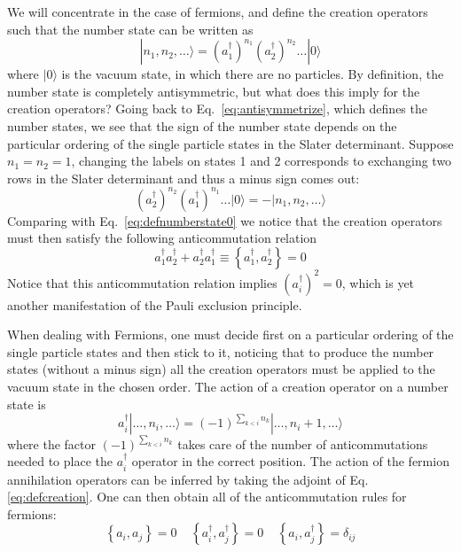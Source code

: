 \documentclass[oneside,11pt]{memoir}
\begin{document}
We will concentrate in the case of fermions, and define the creation operators
such that the number state can be written as 
\begin{equation}
 | n_{1}, n_{2}, \ldots \rangle = 
    \left( a_{1}^{\dagger}\right)^{n_{1}} 
    \left( a_{2}^{\dagger}\right)^{n_{2}} \ldots |0\rangle 
\label{eq:defnumberstate0}
\end{equation}
where $|0\rangle$ is the vacuum state, in which there are no particles.  By
definition, the number state is completely antisymmetric, but what does this
imply for the creation operators?  Going back to Eq.~\ref{eq:antisymmetrize},
which defines the number states,  we see that the sign of the number state
depends on the particular ordering of the single particle states in the Slater
determinant.   Suppose $n_{1}=n_{2}=1$, changing the labels on states 1 and 2
corresponds to exchanging two rows in the Slater determinant and thus a minus
sign comes out: 
\begin{equation} 
    \left( a_{2}^{\dagger}\right)^{n_{2}} 
    \left( a_{1}^{\dagger}\right)^{n_{1}} \ldots |0\rangle  = 
  - | n_{1}, n_{2}, \ldots \rangle 
\end{equation}
Comparing with Eq.~\ref{eq:defnumberstate0} we notice that the creation
operators must then satisfy the following anticommutation relation
\begin{equation} 
    a_{1}^{\dagger} a_{2}^{\dagger} + a_{2}^{\dagger} a_{1}^{\dagger} 
   \equiv  \left\lbrace  a_{1}^{\dagger} , a_{2}^{\dagger} \right\rbrace 
   = 0 
\end{equation}
Notice that this anticommutation relation implies $\left( a_{i}^{\dagger}
\right)^{2} = 0$, which is yet another manifestation of the Pauli exclusion
principle.
   
When dealing with Fermions, one must decide first on a particular ordering of
the single particle states and then stick to it, noticing that to produce the
number states (without a minus sign) all the creation operators must be applied
to the vacuum state in the chosen order.   The action of a creation operator on
a number state is
\begin{equation}  
  a_{i}^{\dagger}| \ldots, n_{i}, \ldots \rangle 
  =    (-1)^{\sum_{k<i} n_{k}} | \ldots, n_{i}+1, \ldots \rangle 
 \label{eq:defcreation}
\end{equation} 
where the factor $(-1)^{\sum_{k<i} n_{k}}$ takes care of the number of
anticommutations needed to place the $a_{i}^{\dagger}$ operator in the correct
position.  The action of the fermion annihilation operators can be inferred by
taking the adjoint of Eq.~ \ref{eq:defcreation}.  One can then obtain all of
the anticommutation rules for fermions: 
\begin{equation}
  \left\lbrace a_{i}, a_{j} \right\rbrace = 0 \ \ \ \ \  
  \left\lbrace a_{i}^{\dagger}, a_{j}^{\dagger} \right\rbrace = 0 \ \ \ \ \   
  \left\lbrace a_{i},a_{j}^{\dagger} \right\rbrace=\delta_{ij}
\end{equation}
\end{document}
